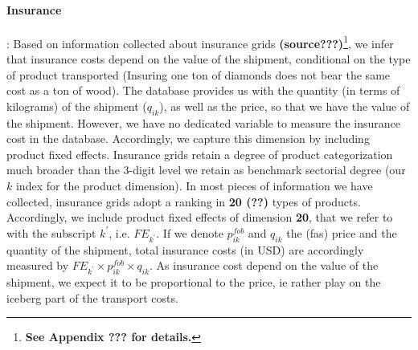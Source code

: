 \documentclass[a4paper,11pt]{article}
\begin{document}
\paragraph{Insurance}: Based on information collected about insurance grids \textbf{(source???)}\footnote{\textbf{See Appendix ??? for details.}}, we infer that insurance costs depend on the value of the shipment, conditional on the type of product transported (Insuring one ton of diamonds does not bear the same cost as a ton of wood). The database provides us with the quantity (in terms of kilograms) of the shipment ($q_{ik}$), as well as the price, so that we have the value of the shipment. However, we have no dedicated variable to measure the insurance cost in the database. Accordingly, we capture this dimension by including product fixed effects. Insurance grids retain a degree of product categorization much broader than the 3-digit level we retain as benchmark sectorial degree (our $k$ index for the product dimension). In most pieces of information we have collected, insurance grids adopt a ranking in \textbf{20 (??)} types of products. Accordingly, we include product fixed effects of dimension \textbf{20}, that we refer to with the subscript $k^\prime$, i.e. $FE_{k^\prime}$. If we denote $p_{ik}^{fob}$ and $q_{ik}$ the (fas) price and the quantity of the shipment, total insurance costs (in USD) are accordingly measured by $FE_{k^\prime}\times p_{ik}^{fob}\times q_{ik}$. As insurance cost depend on the value of the shipment, we expect it to be proportional to the price, ie rather play on the iceberg part of the transport costs.
\end{document}
